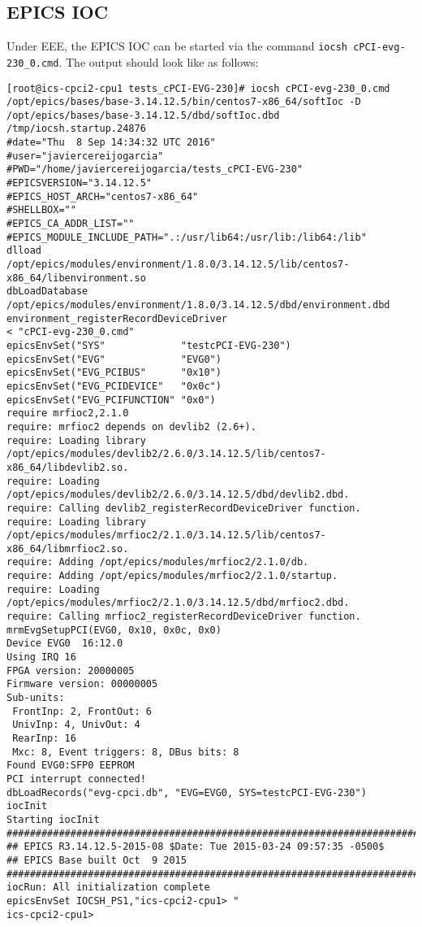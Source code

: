 \documentclass[11pt
  , a4paper
  , article
  , oneside
  , showtrims
]{memoir}
\begin{document}
\subsection{EPICS IOC}
Under EEE, the EPICS IOC can be started via the command \texttt{iocsh cPCI-evg-230\_0.cmd}. The output should look like as follows:

\begin{lstlisting}[style=termstyle]
[root@ics-cpci2-cpu1 tests_cPCI-EVG-230]# iocsh cPCI-evg-230_0.cmd 
/opt/epics/bases/base-3.14.12.5/bin/centos7-x86_64/softIoc -D /opt/epics/bases/base-3.14.12.5/dbd/softIoc.dbd /tmp/iocsh.startup.24876
#date="Thu  8 Sep 14:34:32 UTC 2016"
#user="javiercereijogarcia"
#PWD="/home/javiercereijogarcia/tests_cPCI-EVG-230"
#EPICSVERSION="3.14.12.5"
#EPICS_HOST_ARCH="centos7-x86_64"
#SHELLBOX=""
#EPICS_CA_ADDR_LIST=""
#EPICS_MODULE_INCLUDE_PATH=".:/usr/lib64:/usr/lib:/lib64:/lib"
dlload         /opt/epics/modules/environment/1.8.0/3.14.12.5/lib/centos7-x86_64/libenvironment.so
dbLoadDatabase /opt/epics/modules/environment/1.8.0/3.14.12.5/dbd/environment.dbd
environment_registerRecordDeviceDriver
< "cPCI-evg-230_0.cmd"
epicsEnvSet("SYS"             "testcPCI-EVG-230")
epicsEnvSet("EVG"             "EVG0")
epicsEnvSet("EVG_PCIBUS"      "0x10")
epicsEnvSet("EVG_PCIDEVICE"   "0x0c")
epicsEnvSet("EVG_PCIFUNCTION" "0x0")
require mrfioc2,2.1.0
require: mrfioc2 depends on devlib2 (2.6+).
require: Loading library /opt/epics/modules/devlib2/2.6.0/3.14.12.5/lib/centos7-x86_64/libdevlib2.so.
require: Loading /opt/epics/modules/devlib2/2.6.0/3.14.12.5/dbd/devlib2.dbd.
require: Calling devlib2_registerRecordDeviceDriver function.
require: Loading library /opt/epics/modules/mrfioc2/2.1.0/3.14.12.5/lib/centos7-x86_64/libmrfioc2.so.
require: Adding /opt/epics/modules/mrfioc2/2.1.0/db.
require: Adding /opt/epics/modules/mrfioc2/2.1.0/startup.
require: Loading /opt/epics/modules/mrfioc2/2.1.0/3.14.12.5/dbd/mrfioc2.dbd.
require: Calling mrfioc2_registerRecordDeviceDriver function.
mrmEvgSetupPCI(EVG0, 0x10, 0x0c, 0x0)
Device EVG0  16:12.0
Using IRQ 16
FPGA version: 20000005
Firmware version: 00000005
Sub-units:
 FrontInp: 2, FrontOut: 6
 UnivInp: 4, UnivOut: 4
 RearInp: 16
 Mxc: 8, Event triggers: 8, DBus bits: 8
Found EVG0:SFP0 EEPROM
PCI interrupt connected!
dbLoadRecords("evg-cpci.db", "EVG=EVG0, SYS=testcPCI-EVG-230")
iocInit
Starting iocInit
############################################################################
## EPICS R3.14.12.5-2015-08 $Date: Tue 2015-03-24 09:57:35 -0500$
## EPICS Base built Oct  9 2015
############################################################################
iocRun: All initialization complete
epicsEnvSet IOCSH_PS1,"ics-cpci2-cpu1> "
ics-cpci2-cpu1>
\end{lstlisting}
\end{document}
